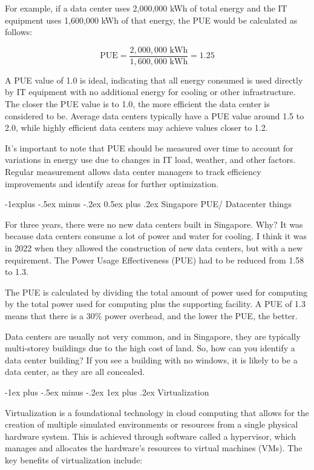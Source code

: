 \documentclass[10pt, landscape]{article}
\makeatletter
\renewcommand{\subsection}{\@startsection{subsection}{2}{0mm}%
  {-1explus -.5ex minus -.2ex}%
  {0.5ex plus .2ex}%
{\normalfont\normalsize\bfseries}}
\renewcommand{\subsubsection}{\@startsection{subsubsection}{3}{0mm}%
  {-1ex plus -.5ex minus -.2ex}%
  {1ex plus .2ex}%
{\normalfont\small\bfseries}}%
\makeatother
\begin{document}
\begin{multicols*}{4}
For example, if a data center uses 2,000,000 kWh of total energy and the
IT equipment uses 1,600,000 kWh of that energy, the PUE would be
calculated as follows:

\[
\text{PUE} = \frac{2,000,000 \text{ kWh}}{1,600,000 \text{ kWh}} = 1.25
\]

A PUE value of 1.0 is ideal, indicating that all energy consumed is used
directly by IT equipment with no additional energy for cooling or other
infrastructure. The closer the PUE value is to 1.0, the more efficient
the data center is considered to be. Average data centers typically have
a PUE value around 1.5 to 2.0, while highly efficient data centers may
achieve values closer to 1.2.

It's important to note that PUE should be measured over time to account
for variations in energy use due to changes in IT load, weather, and
other factors. Regular measurement allows data center managers to track
efficiency improvements and identify areas for further optimization.

\subsection{Singapore PUE/ Datacenter
things}\label{singapore-pue-datacenter-things}

For three years, there were no new data centers built in Singapore. Why?
It was because data centers consume a lot of power and water for
cooling. I think it was in 2022 when they allowed the construction of
new data centers, but with a new requirement. The Power Usage
Effectiveness (PUE) had to be reduced from 1.58 to 1.3.

The PUE is calculated by dividing the total amount of power used for
computing by the total power used for computing plus the supporting
facility. A PUE of 1.3 means that there is a 30\% power overhead, and
the lower the PUE, the better.

Data centers are usually not very common, and in Singapore, they are
typically multi-storey buildings due to the high cost of land. So, how
can you identify a data center building? If you see a building with no
windows, it is likely to be a data center, as they are all concealed.

\subsubsection{Virtualization}\label{virtualization}

Virtualization is a foundational technology in cloud computing that
allows for the creation of multiple simulated environments or resources
from a single physical hardware system. This is achieved through
software called a hypervisor, which manages and allocates the hardware's
resources to virtual machines (VMs). The key benefits of virtualization
include:


\end{multicols*}
\end{document}
